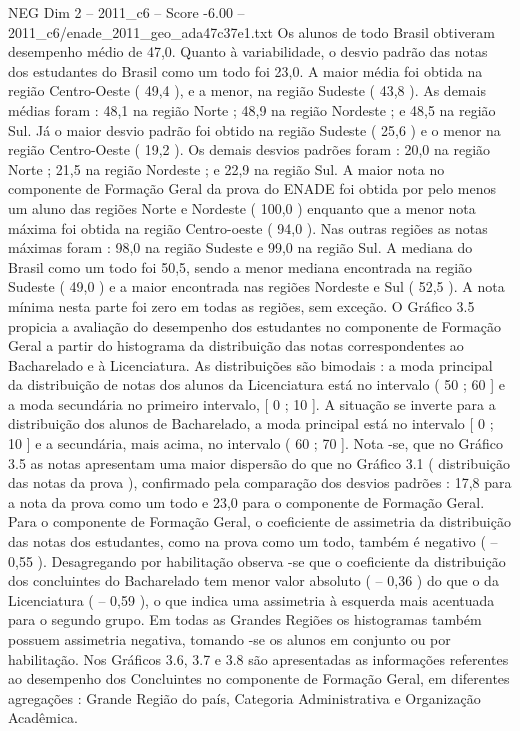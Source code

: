 \begin{textsample}{NEG Dim 2 – 2011\_c6 – Score -6.00 – 2011\_c6/enade\_2011\_geo\_ada47c37e1.txt}
Os alunos de todo Brasil obtiveram desempenho médio de 47,0.
Quanto à variabilidade, o desvio padrão das notas dos estudantes do Brasil como um todo foi 23,0.
A maior média foi obtida na região Centro-Oeste ( 49,4 ), e a menor, na região Sudeste ( 43,8 ).
As demais médias foram : 48,1 na região Norte ; 48,9 na região Nordeste ; e 48,5 na região Sul.
Já o maior desvio padrão foi obtido na região Sudeste ( 25,6 ) e o menor na região Centro-Oeste ( 19,2 ).
Os demais desvios padrões foram : 20,0 na região Norte ; 21,5 na região Nordeste ; e 22,9 na região Sul.
A maior nota no componente de Formação Geral da prova do ENADE foi obtida por pelo menos um aluno das regiões Norte e Nordeste ( 100,0 ) enquanto que a menor nota máxima foi obtida na região Centro-oeste ( 94,0 ).
Nas outras regiões as notas máximas foram : 98,0 na região Sudeste e 99,0 na região Sul.
A mediana do Brasil como um todo foi 50,5, sendo a menor mediana encontrada na região Sudeste ( 49,0 ) e a maior encontrada nas regiões Nordeste e Sul ( 52,5 ).
A nota mínima nesta parte foi zero em todas as regiões, sem exceção.
O Gráfico 3.5 propicia a avaliação do desempenho dos estudantes no componente de Formação Geral a partir do histograma da distribuição das notas correspondentes ao Bacharelado e à Licenciatura.
As distribuições são bimodais : a moda principal da distribuição de notas dos alunos da Licenciatura está no intervalo ( 50 ; 60 ] e a moda secundária no primeiro intervalo, [ 0 ; 10 ].
A situação se inverte para a distribuição dos alunos de Bacharelado, a moda principal está no intervalo [ 0 ; 10 ] e a secundária, mais acima, no intervalo ( 60 ; 70 ].
Nota -se, que no Gráfico 3.5 as notas apresentam uma maior dispersão do que no Gráfico 3.1 ( distribuição das notas da prova ), confirmado pela comparação dos desvios padrões : 17,8 para a nota da prova como um todo e 23,0 para o componente de Formação Geral.
Para o componente de Formação Geral, o coeficiente de assimetria da distribuição das notas dos estudantes, como na prova como um todo, também é negativo ( – 0,55 ).
Desagregando por habilitação observa -se que o coeficiente da distribuição dos concluintes do Bacharelado tem menor valor absoluto ( – 0,36 ) do que o da Licenciatura ( – 0,59 ), o que indica uma assimetria à esquerda mais acentuada para o segundo grupo.
Em todas as Grandes Regiões os histogramas também possuem assimetria negativa, tomando -se os alunos em conjunto ou por habilitação.
Nos Gráficos 3.6, 3.7 e 3.8 são apresentadas as informações referentes ao desempenho dos Concluintes no componente de Formação Geral, em diferentes agregações : Grande Região do país, Categoria Administrativa e Organização Acadêmica.

\end{textsample}
